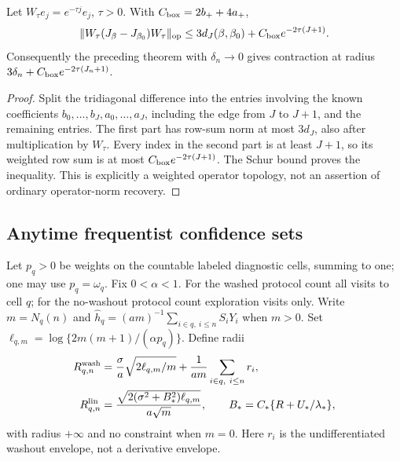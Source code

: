\begin{corollary}
\label{cor:weighted-operator-recovery}
Let \(W_\tau e_j=e^{-\tau j}e_j\), \(\tau>0\). With
\(C_{\rm box}=2b_++4a_+\),
\begin{equation}
 \|W_\tau(J_\beta-J_{\beta_0})W_\tau\|_{\rm op}
 \le3d_J(\beta,\beta_0)+C_{\rm box}e^{-2\tau(J+1)}.
 \label{eq:weighted-operator-bound}
\end{equation}
Consequently the preceding theorem with \(\delta_n\to0\) gives contraction
at radius \(3\delta_n+C_{\rm box}e^{-2\tau(J_n+1)}\).
\end{corollary}
\begin{proof}
Split the tridiagonal difference into the entries involving the known
coefficients \(b_0,\ldots,b_J,a_0,\ldots,a_J\), including the edge from
\(J\) to \(J+1\), and the remaining entries. The first part has row-sum
norm at most \(3d_J\), also after multiplication by \(W_\tau\).
Every index in the second part is at least \(J+1\), so its weighted
row sum is at most \(C_{\rm box}e^{-2\tau(J+1)}\).
The Schur bound proves the inequality. This is explicitly a weighted
operator topology, not an assertion of ordinary operator-norm recovery.
\end{proof}

\subsection{Anytime frequentist confidence sets}
Let \(p_q>0\) be weights on the countable labeled diagnostic cells, summing
to one; one may use \(p_q=\omega_q\). Fix \(0<\alpha<1\).
For the washed protocol count all visits to cell \(q\); for the no-washout
protocol count exploration visits only. Write \(m=N_q(n)\) and
\(\widehat h_q=(am)^{-1}\sum_{i\in q,\ i\le n}S_iY_i\) when \(m>0\).
Set \(\ell_{q,m}=\log\{2m(m+1)/(\alpha p_q)\}\). Define radii
\begin{align}
 R^{\rm wash}_{q,n}&=\frac\sigma a\sqrt{2\ell_{q,m}/m}
        +\frac1{am}\sum_{i\in q,\ i\le n}r_i,\notag\\
 R^{\rm lin}_{q,n}&=\frac{\sqrt{2(\sigma^2+B_*^2)\ell_{q,m}}}{a\sqrt m},
 \qquad B_*=C_*\{R+U_*/\lambda_*\},
 \label{eq:response-confidence-radius}
\end{align}
with radius \(+\infty\) and no constraint when \(m=0\). Here \(r_i\)
is the undifferentiated washout envelope, not a derivative envelope.

